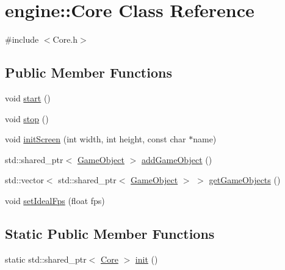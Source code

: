 \hypertarget{classengine_1_1_core}{}\section{engine\+:\+:Core Class Reference}
\label{classengine_1_1_core}


{\ttfamily \#include $<$Core.\+h$>$}

\subsection*{Public Member Functions}
\begin{DoxyCompactItemize}
\item 
void \mbox{\hyperlink{classengine_1_1_core_a77cf73564f2723b8ee3e1d2ea3a41245}{start}} ()
\item 
void \mbox{\hyperlink{classengine_1_1_core_a1dc20e15c8fa894c5049ecbaf7745c0d}{stop}} ()
\item 
void \mbox{\hyperlink{classengine_1_1_core_ae4f596a5326dea97c860171d6ffb6c7d}{init\+Screen}} (int width, int height, const char $\ast$name)
\item 
std\+::shared\+\_\+ptr$<$ \mbox{\hyperlink{classengine_1_1_game_object}{Game\+Object}} $>$ \mbox{\hyperlink{classengine_1_1_core_a1979ac12bd8a259218f42833fc230094}{add\+Game\+Object}} ()
\item 
std\+::vector$<$ std\+::shared\+\_\+ptr$<$ \mbox{\hyperlink{classengine_1_1_game_object}{Game\+Object}} $>$ $>$ \mbox{\hyperlink{classengine_1_1_core_a2adaa238c7ad9d6a3ce461f0010ef71b}{get\+Game\+Objects}} ()
\item 
void \mbox{\hyperlink{classengine_1_1_core_aa7f9076e25297b4035c69c1c3cc636c9}{set\+Ideal\+Fps}} (float fps)
\end{DoxyCompactItemize}
\subsection*{Static Public Member Functions}
\begin{DoxyCompactItemize}
\item 
static std\+::shared\+\_\+ptr$<$ \mbox{\hyperlink{classengine_1_1_core}{Core}} $>$ \mbox{\hyperlink{classengine_1_1_core_ac6e2aa4ca0251d90f187fe650f6e6e4f}{init}} ()
\end{DoxyCompactItemize}
